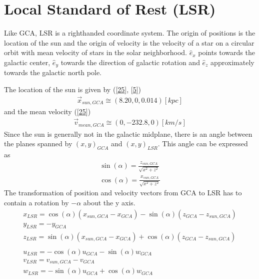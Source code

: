 \documentclass[letterpaper,10pt,english]{sphinxmanual}
\begin{document}
\section{Local Standard of Rest (LSR)}
\label{\detokenize{NBodySimulation/CoordinateSystems:local-standard-of-rest-lsr}}
\sphinxAtStartPar
Like GCA, LSR is a right\sphinxhyphen{}handed coordinate system.
The origin of positions is the location of the sun
and the origin of velocity is the velocity of a star on a circular orbit with mean velocity of stars in the solar neighborhood.
\(\hat{e}_x\) points towards the galactic center, \(\hat{e}_y\) towards the direction of galactic rotation
and \(\hat{e}_z\) approximately towards the galactic north pole.

\sphinxAtStartPar
The location of the sun is given by ({[}\hyperlink{cite.NBodySimulation/Appendix:id28}{25}{]}, {[}\hyperlink{cite.NBodySimulation/Appendix:id29}{5}{]})
\begin{equation*}
\begin{split}\vec{x}_{sun,GCA} \cong  (8.20,0,0.014)[kpc]\end{split}
\end{equation*}
\sphinxAtStartPar
and the mean velocity ({[}\hyperlink{cite.NBodySimulation/Appendix:id28}{25}{]})
\begin{equation*}
\begin{split}\vec{v}_{mean,GCA} \cong  (0,-232.8,0)[km/s]\end{split}
\end{equation*}
\sphinxAtStartPar
Since the sun is generally not in the galactic midplane, there is an angle between the planes spanned by \((x,y)_{GCA}\) and \((x,y)_{LSR}\).
This angle can be expressed as
\begin{equation*}
\begin{split}\sin(\alpha) = \frac{z_{sun,GCA}}{\sqrt{x^2+z^2}} \\
\cos(\alpha) = \frac{x_{sun,GCA}}{\sqrt{x^2+z^2}}\end{split}
\end{equation*}
\sphinxAtStartPar
The transformation of position and velocity vectors from GCA to LSR has to contain a rotation by \(-\alpha\) about the y axis.
\begin{equation*}
\begin{split}x_{LSR} = \cos(\alpha)( x_{sun,GCA} - x_{GCA} ) - \sin(\alpha)(z_{GCA}-z_{sun,GCA}) \\
y_{LSR} = -y_{GCA} \\
z_{LSR} = \sin(\alpha)(x_{sun,GCA} - x_{GCA}) + \cos(\alpha)( z_{GCA} - z_{sun,GCA}) \\ \\
u_{LSR} = -\cos(\alpha)u_{GCA} - \sin(\alpha)w_{GCA} \\
v_{LSR} = v_{sun,GCA}-v_{GCA} \\
w_{LSR} = -\sin(\alpha)u_{GCA} + \cos(\alpha)w_{GCA} \\\end{split}
\end{equation*}
\end{document}
